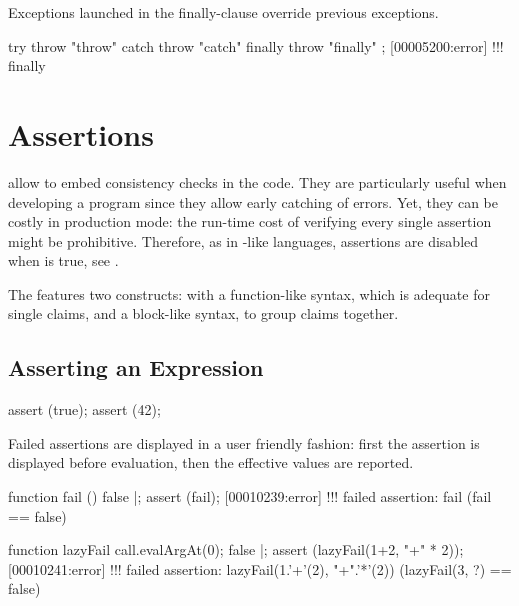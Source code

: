 Exceptions launched in the finally-clause override previous exceptions.

\begin{urbiscript}
try     { throw "throw" }
catch   { throw "catch" }
finally { throw "finally" };
[00005200:error] !!! finally
\end{urbiscript}



\section{Assertions}
\label{sec:lang:assert}


 allow to embed consistency checks in the code.
They are particularly useful when developing a program since they allow
early catching of errors.  Yet, they can be costly in production mode: the
run-time cost of verifying every single assertion might be prohibitive.
Therefore, as in \langC-like languages, assertions are disabled when
 is true, see .

The  features two constructs: with a function-like syntax,
which is adequate for single claims, and a block-like syntax, to group
claims together.

\subsection{Asserting an Expression}

\begin{urbiscript}
assert (true);
assert (42);
\end{urbiscript}

Failed assertions are displayed in a user friendly fashion: first the
assertion is displayed before evaluation, then the effective values are
reported.

\begin{urbiscript}
function fail () { false }|;
assert (fail);
[00010239:error] !!! failed assertion: fail (fail == false)

function lazyFail { call.evalArgAt(0); false }|;
assert (lazyFail(1+2, "+" * 2));
[00010241:error] !!! failed assertion: lazyFail(1.'+'(2), "+".'*'(2)) (lazyFail(3, ?) == false)
\end{urbiscript}

